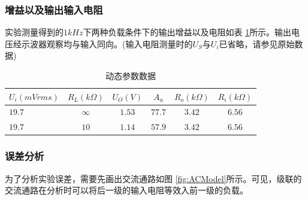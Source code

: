 \documentclass[a4paper,11pt,UTF8]{ctexart}
\begin{document}
  \subsubsection{增益以及输出输入电阻}
  实验测量得到的$1kHz$下两种负载条件下的输出增益以及电阻如表 \ref{tab:tab2}所示。输出电压经示波器观察均与输入同向。(输入电阻测量时的$U_S$与$U_i$已省略，请参见原始数据)
  \begin{table}[!h!tbp]
    \caption{动态参数数据}\label{tab:tab2}
      \centering
      \begin{tabular}{|l|c|c|c|c|c|}
      \hline
      $U_i(mVrms)$  &$R_L(k\Omega)$  &$U_O(V)$ &$A_u$   &$R_o(k\Omega)$  &$R_{i}(k\Omega)$         \\ \hline
      $19.7$        &$\infty$        &$1.53$   &$77.7$  &$3.42$          &$6.56$\\ \hline
      $19.7$        &$10$            &$1.14$   &$57.9$  &$3.42$          &$6.56$\\ \hline
    \end{tabular}
    \end{table}
    \subsubsection{误差分析}
    为了分析实验误差，需要先画出交流通路如图 \ref{fig:ACModel}所示。可见，级联的交流通路在分析时可以将后一级的输入电阻等效入前一级的负载。
\end{document}
